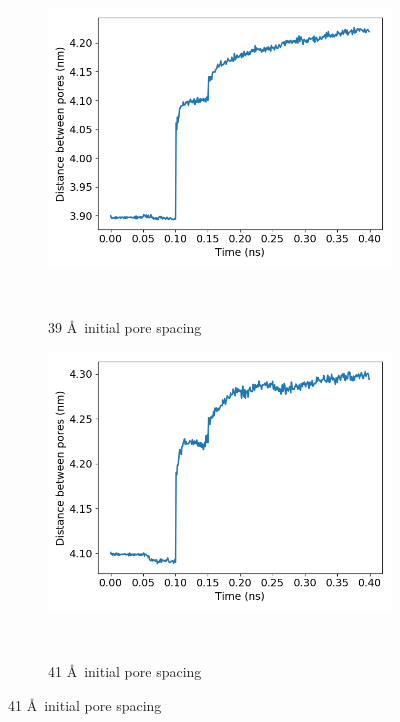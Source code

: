 \documentclass[journal=jpcbfk,manusciprt=article]{achemso}
\begin{document}
  	  \begin{figure}[!htb]
		\centering
		\begin{subfigure}{0.3\textwidth}
			\includegraphics[width=\textwidth]{p2p_39.png}\quad
			\vspace{-1.25em}
			\caption{39 \AA~initial pore spacing}~\label{fig:p2p_39}
		\end{subfigure}
		\begin{subfigure}{0.3\textwidth}
			\includegraphics[width=\textwidth]{p2p_41.png}\quad
			\vspace{-1.25em}
			\caption{41 \AA~initial pore spacing}~\label{fig:p2p_41}
		\end{subfigure}

\end{figure}
\end{document}
